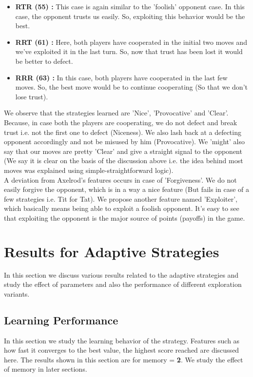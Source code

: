 \documentclass[a4paper]{article}
\begin{document}
\begin{itemize}
	\item \textbf{RTR (55) :} This case is again similar to the 'foolish' opponent case. In this case, the opponent trusts us easily. So, exploiting this behavior would be the best.
	\item \textbf{RRT (61) :} Here, both players have cooperated in the initial two moves and we've exploited it in the last turn. So, now that trust has been lost it would be better to defect.
	\item \textbf{RRR (63) :} In this case, both players have cooperated in the last few moves. So, the best move would be to continue cooperating (So that we don't lose trust).
	\end{itemize}
	
	We observe that the strategies learned are 'Nice', 'Provocative' and 'Clear'. Because, in case both the players are cooperating, we do not defect and break trust i.e. not the first one to defect (Niceness). We also lash back at a defecting opponent accordingly and not be misused by him (Provocative).  We 'might' also say that our moves are pretty 'Clear' and give a straight signal to the opponent (We say it is clear on the basis of the discussion above i.e. the idea behind most moves was explained using simple-straightforward logic).\\
	
	A deviation from Axelrod's features occurs in case of 'Forgiveness'. We do not easily forgive the opponent, which is in a way a nice feature (But fails in case of a few strategies i.e. Tit for Tat). We propose another feature named 'Exploiter', which basically means being able to exploit a foolish opponent. It's easy to see that exploiting the opponent is the major source of points (payoffs) in the game.
	
	\section{Results for Adaptive Strategies}

	In this section we discuss various results related to the adaptive strategies and study the effect of parameters and also the performance of different exploration variants.

	\subsection{Learning Performance}
		
	In this section we study the learning behavior of the strategy. Features such as how fast it converges to the best value, the highest score reached are discussed here. The results shown in this section are for memory = \textbf{2}. We study the effect of memory in later sections.
		
\end{document}
